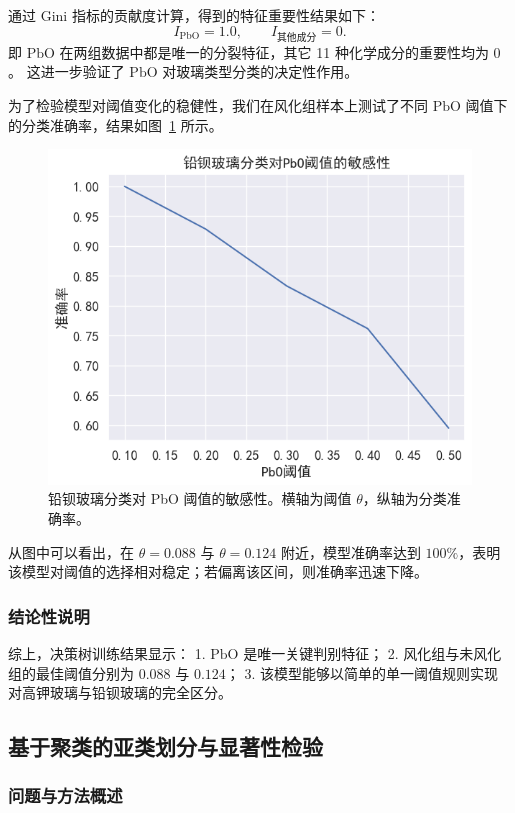 \documentclass[withoutpreface,bwprint]{cumcmthesis}
\begin{document}
通过 Gini 指标的贡献度计算，得到的特征重要性结果如下：
\[
I_{\mathrm{PbO}}=1.0,\qquad I_{\text{其他成分}}=0.
\]
即 $\mathrm{PbO}$ 在两组数据中都是唯一的分裂特征，其它 11 种化学成分的重要性均为 $0$。  
这进一步验证了 $\mathrm{PbO}$ 对玻璃类型分类的决定性作用。  

为了检验模型对阈值变化的稳健性，我们在风化组样本上测试了不同 $\mathrm{PbO}$ 阈值下的分类准确率，结果如图~\ref{fig:pbo_sensitivity} 所示。  

\begin{figure}[htbp]
    \centering
    \includegraphics[width=0.7\linewidth]{./figures/2.1/1.png}
    \caption{铅钡玻璃分类对 PbO 阈值的敏感性。横轴为阈值 $\theta$，纵轴为分类准确率。}
    \label{fig:pbo_sensitivity}
\end{figure}

从图中可以看出，在 $\theta=0.088$ 与 $\theta=0.124$ 附近，模型准确率达到 $100\%$，表明该模型对阈值的选择相对稳定；若偏离该区间，则准确率迅速下降。  

\subsubsection{结论性说明}

综上，决策树训练结果显示：  
1. $\mathrm{PbO}$ 是唯一关键判别特征；  
2. 风化组与未风化组的最佳阈值分别为 $0.088$ 与 $0.124$；  
3. 该模型能够以简单的单一阈值规则实现对高钾玻璃与铅钡玻璃的完全区分。

\subsection{基于聚类的亚类划分与显著性检验}

\subsubsection{问题与方法概述}
\end{document}
